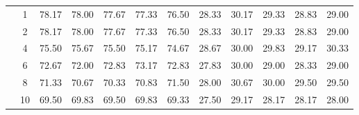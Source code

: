 \begin{table}[htpb]
\begin{tabular}{|c|c|c c c c c|c c c c c|}
\multicolumn{1}{|c|}{ \multirow{6}{*}{\rotatebox[origin=c]{90}{\textbf{K-vizinhos}}} }
&1	&78.17	&78.00	&77.67	&77.33	&76.50	&28.33	&30.17&	29.33&	28.83	&29.00	\\\cline{2-12}
&2	&78.17	&78.00	&77.67	&77.33	&76.50	&28.33	&30.17&	29.33&	28.83	&29.00	\\\cline{2-12}
&4	&75.50	&75.67	&75.50	&75.17	&74.67	&28.67	&30.00&	29.83&	29.17	&30.33	\\\cline{2-12}
&6	&72.67	&72.00	&72.83	&73.17	&72.83	&27.83	&30.00&	29.00&	28.33	&29.00	\\\cline{2-12}
&8	&71.33	&70.67	&70.33	&70.83	&71.50	&28.00	&30.67&	30.00&	29.50	&29.50	\\\cline{2-12}
&10	&69.50	&69.83	&69.50	&69.83	&69.33	&27.50	&29.17&	28.17&	28.17	&28.00	


\\\midrule

	\end{tabular}
\end{table}






